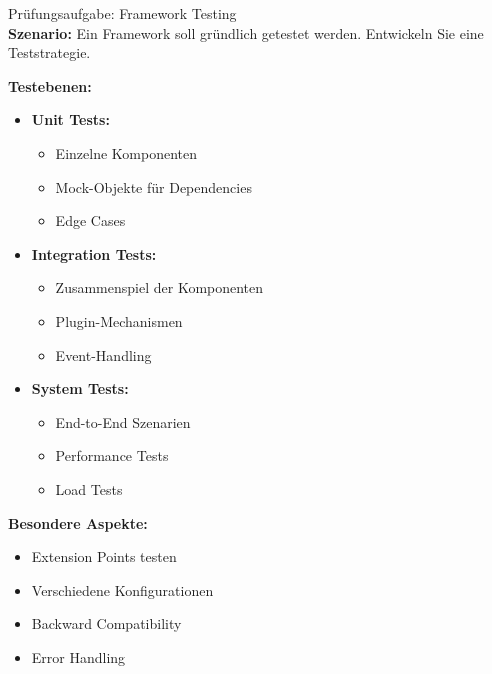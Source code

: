 \begin{example2}{Prüfungsaufgabe: Framework Testing}\\
\textbf{Szenario:}
Ein Framework soll gründlich getestet werden. Entwickeln Sie eine Teststrategie.

\textbf{Testebenen:}
\begin{itemize}
    \item \textbf{Unit Tests:}
    \begin{itemize}
        \item Einzelne Komponenten
        \item Mock-Objekte für Dependencies
        \item Edge Cases
    \end{itemize}
    
    \item \textbf{Integration Tests:}
    \begin{itemize}
        \item Zusammenspiel der Komponenten
        \item Plugin-Mechanismen
        \item Event-Handling
    \end{itemize}
    
    \item \textbf{System Tests:}
    \begin{itemize}
        \item End-to-End Szenarien
        \item Performance Tests 
        \item Load Tests
    \end{itemize}
\end{itemize}

\textbf{Besondere Aspekte:}
\begin{itemize}
    \item Extension Points testen
    \item Verschiedene Konfigurationen
    \item Backward Compatibility
    \item Error Handling
\end{itemize}
\end{example2}





